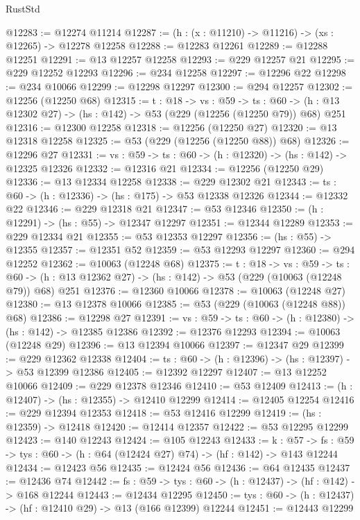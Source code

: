 \begin{lexlean}{RustStd}
\begin{coremodule}
@12283 := @12274 @11214
@12287 := (h : (x : @11210) -> @11216) -> (xs : @12265) -> @12278 @12258
@12288 := @12283 @12261
@12289 := @12288 @12251
@12291 := @13 @12257 @12258
@12293 := @229 @12257 @21
@12295 := @229 @12252 @12293
@12296 := @234 @12258
@12297 := @12296 @22
@12298 := @234 @10066
@12299 := @12298 @12297
@12300 := @294 @12257
@12302 := @12256 (@12250 @68)
@12315 := {t : @18} ->
  {vs : @59} ->
  {ts : @60} -> (h : @13 @12302 @27) -> (hs : @142) -> @53 (@229 (@12256 (@12250 @79)) @68) @251
@12316 := @12300 @12258
@12318 := @12256 (@12250 @27)
@12320 := @13 @12318 @12258
@12325 := @53 (@229 (@12256 (@12250 @88)) @68)
@12326 := @12296 @27
@12331 := {vs : @59} -> {ts : @60} -> (h : @12320) -> (hs : @142) -> @12325 @12326
@12332 := @12316 @21
@12334 := @12256 (@12250 @29)
@12336 := @13 @12334 @12258
@12338 := @229 @12302 @21
@12343 := {ts : @60} -> (h : @12336) -> (hs : @175) -> @53 @12338 @12326
@12344 := @12332 @22
@12346 := @229 @12318 @21
@12347 := @53 @12346
@12350 := (h : @12291) -> (hs : @55) -> @12347 @12297
@12351 := @12344 @12289
@12353 := @229 @12334 @21
@12355 := @53 @12353 @12297
@12356 := (hs : @55) -> @12355
@12357 := @12351 @52
@12359 := @53 @12293 @12297
@12360 := @294 @12252
@12362 := @10063 (@12248 @68)
@12375 := {t : @18} ->
  {vs : @59} ->
  {ts : @60} -> (h : @13 @12362 @27) -> (hs : @142) -> @53 (@229 (@10063 (@12248 @79)) @68) @251
@12376 := @12360 @10066
@12378 := @10063 (@12248 @27)
@12380 := @13 @12378 @10066
@12385 := @53 (@229 (@10063 (@12248 @88)) @68)
@12386 := @12298 @27
@12391 := {vs : @59} -> {ts : @60} -> (h : @12380) -> (hs : @142) -> @12385 @12386
@12392 := @12376 @12293
@12394 := @10063 (@12248 @29)
@12396 := @13 @12394 @10066
@12397 := @12347 @29
@12399 := @229 @12362 @12338
@12404 := {ts : @60} -> (h : @12396) -> (hs : @12397) -> @53 @12399 @12386
@12405 := @12392 @12297
@12407 := @13 @12252 @10066
@12409 := @229 @12378 @12346
@12410 := @53 @12409
@12413 := (h : @12407) -> (hs : @12355) -> @12410 @12299
@12414 := @12405 @12254
@12416 := @229 @12394 @12353
@12418 := @53 @12416 @12299
@12419 := (hs : @12359) -> @12418
@12420 := @12414 @12357
@12422 := @53 @12295 @12299
@12423 := @140 @12243
@12424 := @105 @12243
@12433 := {k : @57} ->
  {fs : @59} -> {tys : @60} -> (h : @64 (@12424 @27) @74) -> (hf : @142) -> @143 @12244
@12434 := @12423 @56
@12435 := @12424 @56
@12436 := @64 @12435
@12437 := @12436 @74
@12442 := {fs : @59} -> {tys : @60} -> (h : @12437) -> (hf : @142) -> @168 @12244
@12443 := @12434 @12295
@12450 := {tys : @60} -> (h : @12437) -> (hf : @12410 @29) -> @13 (@166 @12399) @12244
@12451 := @12443 @12299

\end{coremodule}
\end{lexlean}

